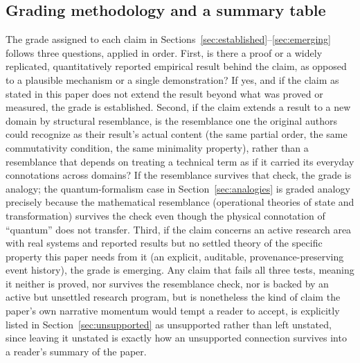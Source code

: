 \documentclass[11pt]{article}
\begin{document}
\subsection{Grading methodology and a summary table}
\label{sec:methodology}

The grade assigned to each claim in Sections~\ref{sec:established}--\ref{sec:emerging} follows three questions, applied in order. First, is there a proof or a widely replicated, quantitatively reported empirical result behind the claim, as opposed to a plausible mechanism or a single demonstration? If yes, and if the claim as stated in this paper does not extend the result beyond what was proved or measured, the grade is established. Second, if the claim extends a result to a new domain by structural resemblance, is the resemblance one the original authors could recognize as their result's actual content (the same partial order, the same commutativity condition, the same minimality property), rather than a resemblance that depends on treating a technical term as if it carried its everyday connotations across domains? If the resemblance survives that check, the grade is analogy; the quantum-formalism case in Section~\ref{sec:analogies} is graded analogy precisely because the mathematical resemblance (operational theories of state and transformation) survives the check even though the physical connotation of ``quantum'' does not transfer. Third, if the claim concerns an active research area with real systems and reported results but no settled theory of the specific property this paper needs from it (an explicit, auditable, provenance-preserving event history), the grade is emerging. Any claim that fails all three tests, meaning it neither is proved, nor survives the resemblance check, nor is backed by an active but unsettled research program, but is nonetheless the kind of claim the paper's own narrative momentum would tempt a reader to accept, is explicitly listed in Section~\ref{sec:unsupported} as unsupported rather than left unstated, since leaving it unstated is exactly how an unsupported connection survives into a reader's summary of the paper.
\end{document}

